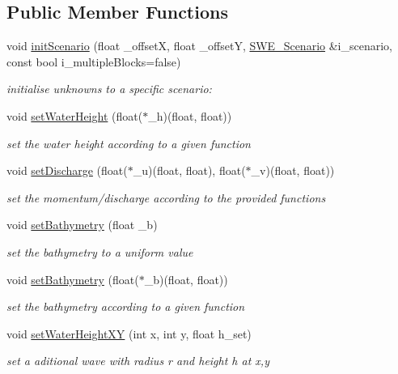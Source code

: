 \subsection*{Public Member Functions}
\begin{DoxyCompactItemize}
\item 
void \hyperlink{classSWE__Block_a46b715c584468a5daa975ec1eb1ab947}{init\+Scenario} (float \+\_\+offsetX, float \+\_\+offsetY, \hyperlink{classSWE__Scenario}{S\+W\+E\+\_\+\+Scenario} \&i\+\_\+scenario, const bool i\+\_\+multiple\+Blocks=false)
\begin{DoxyCompactList}\small\item\em initialise unknowns to a specific scenario\+: \end{DoxyCompactList}\item 
void \hyperlink{classSWE__Block_a6481ce1c80a219fbefefdcbd13ed3688}{set\+Water\+Height} (float($\ast$\+\_\+h)(float, float))
\begin{DoxyCompactList}\small\item\em set the water height according to a given function \end{DoxyCompactList}\item 
void \hyperlink{classSWE__Block_a245332c325fd0ff6a7e9c2d3d9454970}{set\+Discharge} (float($\ast$\+\_\+u)(float, float), float($\ast$\+\_\+v)(float, float))
\begin{DoxyCompactList}\small\item\em set the momentum/discharge according to the provided functions \end{DoxyCompactList}\item 
void \hyperlink{classSWE__Block_af2ab34b138a14f2c295849f3b2acc5f3}{set\+Bathymetry} (float \+\_\+b)
\begin{DoxyCompactList}\small\item\em set the bathymetry to a uniform value \end{DoxyCompactList}\item 
void \hyperlink{classSWE__Block_ad4214fcfd102a4c167d274ad87d9dd90}{set\+Bathymetry} (float($\ast$\+\_\+b)(float, float))
\begin{DoxyCompactList}\small\item\em set the bathymetry according to a given function \end{DoxyCompactList}\item 
void \hyperlink{classSWE__Block_a215c50ff1bf0038cbeb90569593c5aa9}{set\+Water\+Height\+XY} (int x, int y, float h\+\_\+set)
\begin{DoxyCompactList}\small\item\em set a aditional wave with radius r and height h at x,y \end{DoxyCompactList}\item 

\end{DoxyCompactItemize}
